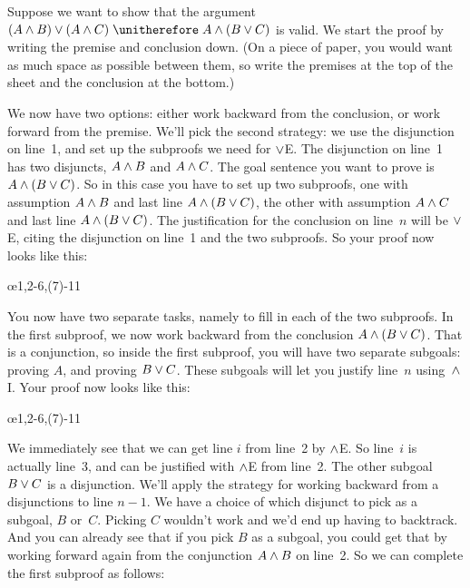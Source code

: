 Suppose we want to show that the argument $(A \eand B) \eor (A \eand C) \therefore A \eand (B \eor C)$ is valid. We start the proof by writing the premise and conclusion down. (On a piece of paper, you would want as much space as possible between them, so write the premises at the top of the sheet and the conclusion at the bottom.)
\begin{fitchproof}
   \PR
\ellipsesline
\end{fitchproof}
We now have two options: either work backward from the conclusion, or work forward from the premise. We'll pick the second strategy: we use the disjunction on line~1, and set up the subproofs we need for $\vee$E. The disjunction on line~1 has two disjuncts, $A \wedge B$ and $A \wedge C$. The goal sentence you want to prove is $A \wedge (B \vee C)$. So in this case you have to set up two subproofs, one with assumption $A \wedge B$ and last line $A \wedge (B \vee C)$, the other with assumption $A \wedge C$ and last line $A \wedge (B \vee C)$. The justification for the conclusion on line~$n$ will be $\vee$E, citing the disjunction on line~1 and the two subproofs. So your proof now looks like this:
\begin{fitchproof}
	\PR
	\open
	\AS
	\ellipsesline 
	\close
	\open
	\AS
	\ellipsesline
	\close
	\oe{1,2-6,(7)-11}
\end{fitchproof}
You now have two separate tasks, namely to fill in each of the two subproofs. In the first subproof, we now work backward from the conclusion $A \wedge (B \vee C)$. That is a conjunction, so inside the first subproof, you will have two separate subgoals: proving $A$, and proving $B \vee C$. These subgoals will let you justify line~$n$ using~$\wedge$I. Your proof now looks like this:
\begin{fitchproof}
	\PR
	\open
	\AS
	\ellipsesline
	\ellipsesline
	\close
	\open
	\AS
	\ellipsesline
	\close
	\oe{1,2-6,(7)-11}
\end{fitchproof}
We immediately see that we can get line $i$ from line~2 by $\wedge$E. So line~$i$ is actually line~3, and can be justified with $\wedge$E from line~2. The other subgoal $B \vee C$ is a disjunction. We'll apply the strategy for working backward from a disjunctions to line $n-1$. We have a choice of which disjunct to pick as a subgoal, $B$ or~$C$. Picking $C$ wouldn't work and we'd end up having to backtrack. And you can already see that if you pick $B$ as a subgoal, you could get that by working forward again from the conjunction $A \wedge B$ on line~2. So we can complete the first subproof as follows:
